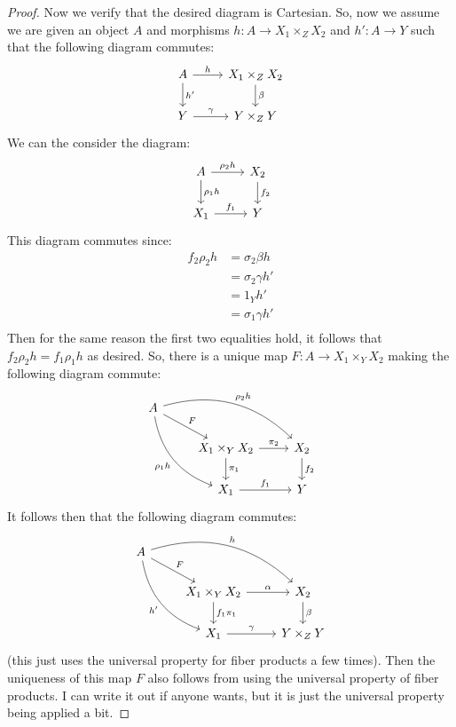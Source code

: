 \documentclass{amsart}
\begin{document}
\begin{proof}
    Now we verify that the desired diagram is Cartesian. So, now we assume we are given an object $A$ and morphisms $h:A\rightarrow X_1\times_Z X_2$ and $h':A\rightarrow Y$ such that the following diagram commutes:
    \begin{equation*}
        \begin{tikzcd}
            A \arrow[r, "h"] \arrow[d, "h'"] & X_1\times_ZX_2 \arrow[d, "\beta"] \\
            Y \arrow[r, "\gamma"] & Y\times_ZY 
        \end{tikzcd}
    \end{equation*}
    We can the consider the diagram:
    \begin{equation*}
        \begin{tikzcd}
            A \arrow[r, "\rho_2 h"] \arrow[d, "\rho_1 h"] & X_2 \arrow[d, "f_2"]\\
            X_1 \arrow[r, "f_1"] & Y
        \end{tikzcd}
    \end{equation*}
    This diagram commutes since:
    \begin{align*}
        f_2\rho_2h &= \sigma_2\beta h \tag{definition of $\beta$} \\
        &= \sigma_2\gamma h' \\
        &= 1_Yh' \tag{definition of $\gamma$} \\
        &= \sigma_1\gamma h' \tag{definition of $\gamma$} \\
    \end{align*}
    Then for the same reason the first two equalities hold, it follows that $f_2\rho_2h=f_1\rho_1h$ as desired. So, there is a unique map $F:A\rightarrow X_1\times_YX_2$ making the following diagram commute:
    \begin{equation*}
        \begin{tikzcd}
            A \arrow[rrd, "\rho_2 h", bend left] \arrow[rd, "F"] \arrow[ddr, "\rho_1 h"', bend right] & & \\
            & X_1\times_Y X_2 \arrow[r, "\pi_2"] \arrow[d, "\pi_1"] & X_2 \arrow[d, "f_2"] \\
            & X_1 \arrow[r, "f_1"] & Y
        \end{tikzcd}
    \end{equation*}
    It follows then that the following diagram commutes:
    \begin{equation*}
        \begin{tikzcd}
            A \arrow[rrd, "h", bend left] \arrow[rd, "F"] \arrow[ddr, "h'"', bend right] & & \\
            & X_1\times_Y X_2 \arrow[r, "\alpha"] \arrow[d, "f_1\pi_1"] & X_2 \arrow[d, "\beta"] \\
            & X_1 \arrow[r, "\gamma"] & Y\times_ZY
        \end{tikzcd}
    \end{equation*}
    (this just uses the universal property for fiber products a few times). Then the uniqueness of this map $F$ also follows from using the universal property of fiber products. I can write it out if anyone wants, but it is just the universal property being applied a bit.  
\end{proof}
\end{document}
